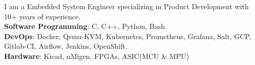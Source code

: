
\begin{cvparagraph}
    I am a Embedded System Engineer specializing in Product Development with 10+ years of experience.\\
\textbf{Software Programming}:  C, C++, Python, Bash\\
\textbf{DevOps}:  Docker, Qemu-KVM, Kubernetes, Prometheus, Grafana, Salt, GCP, Gitlab-CI, Airflow, Jenkins, OpenShift.\\
	\textbf{Hardware}:  Kicad, nMigen, FPGAs, ASIC(MCU & MPU)\\
\end{cvparagraph}




